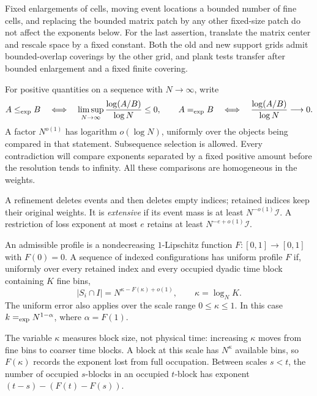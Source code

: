 Fixed enlargements of cells, moving event locations a bounded number of
fine cells, and replacing the bounded matrix patch by any other fixed-size
patch do not affect the exponents below.  For the last assertion, translate
the matrix center and rescale space by a fixed constant.  Both the old and
new support grids admit bounded-overlap coverings by the other grid, and
plank tests transfer after bounded enlargement and a fixed finite covering.

\begin{convention}\label{conv:exponents}
For positive quantities on a sequence with $N\to\infty$, write
\[
 A\mathrel{\leq_{\mathrm{exp}}} B
 \quad\Longleftrightarrow\quad
 \limsup_{N\to\infty}\frac{\log(A/B)}{\log N}\le0,
 \qquad
 A\mathrel{=_{\mathrm{exp}}} B
 \quad\Longleftrightarrow\quad
 \frac{\log(A/B)}{\log N}\longrightarrow0.
\]
A factor $N^{o(1)}$ has logarithm $o(\log N)$, uniformly over the objects
being compared in that statement.  Subsequence selection is allowed.
Every contradiction will compare exponents separated by a fixed positive
amount before the resolution tends to infinity.  All these comparisons are
homogeneous in the weights.
\end{convention}

A refinement deletes events and then deletes empty indices; retained
indices keep their original weights.  It is \emph{extensive} if its event
mass is at least $N^{-o(1)}\mathcal I$.  A restriction of loss exponent at
most $e$ retains at least $N^{-e+o(1)}\mathcal I$.

\begin{definition}\label{def:uniform-profile}
An admissible profile is a nondecreasing $1$-Lipschitz function
$F:[0,1]\to[0,1]$ with $F(0)=0$.  A sequence of indexed configurations has
uniform profile $F$ if, uniformly over every retained index and every
occupied dyadic time block containing $K$ fine bins,
\begin{equation}\label{eq:uniform-profile}
 |S_i\cap I|=N^{\kappa-F(\kappa)+o(1)},
 \qquad \kappa=\log_N K.
\end{equation}
The uniform error also applies over the scale range $0\le\kappa\le1$.
In this case $k\mathrel{=_{\mathrm{exp}}} N^{1-\alpha}$, where $\alpha=F(1)$.
\end{definition}

The variable $\kappa$ measures block size, not physical time: increasing
$\kappa$ moves from fine bins to coarser time blocks. A block at this scale
has $N^\kappa$ available bins, so $F(\kappa)$ records the exponent lost
from full occupation. Between scales $s<t$, the number of occupied
$s$-blocks in an occupied $t$-block has exponent
$(t-s)-(F(t)-F(s))$.

